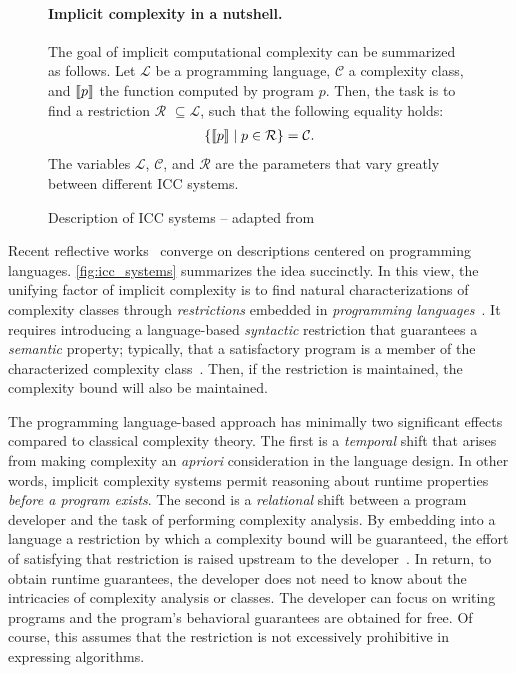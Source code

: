 \begin{figure}[t]
    \begin{mdframed}
        \paragraph*{Implicit complexity in a nutshell.}
        The goal of implicit computational complexity can be summarized as follows.
        Let \(\mathcal{L}\) be a programming language,
        \(\mathcal{C}\) a complexity class,
        and \(\llbracket p\rrbracket\) the function computed by program \(p\).
        Then, the task is to find a restriction \(\mathcal{R}\) \(\subseteq \mathcal{L}\), such that the following equality holds:
        \begin{align*}\{ \llbracket p\rrbracket \mid p \in \mathcal{R} \} = \mathcal{C}.\end{align*}
        The variables \(\mathcal{L}\),
        \(\mathcal{C}\), and
        \(\mathcal{R}\) are the parameters that vary greatly between different ICC systems.
    \end{mdframed}
    \caption[Implicit complexity in a nutshell]
    {Description of ICC systems -- adapted from~\textcite[p. 7]{pchoux2020}}
    \label{fig:icc_systems}
\end{figure}

Recent reflective works~\cite{pchoux2020,hoffmann2022} converge on descriptions centered on programming languages.
\autoref{fig:icc_systems} summarizes the idea succinctly.
In this view, the unifying factor of implicit complexity is to find natural characterizations of complexity classes through \emph{restrictions} embedded in \emph{programming languages}~\cite{hoffmann2022}.
It requires introducing a language-based \emph{syntactic} restriction that guarantees a \emph{semantic} property;
typically, that a satisfactory program is a member of the characterized complexity class~\cite{moyen2017}.
Then, if the restriction is maintained, the complexity bound will also be maintained.

The programming language-based approach has minimally two significant effects compared to classical complexity theory.
The first is a \emph{temporal} shift that arises from making complexity an \emph{apriori} consideration in the language design.
In other words, implicit complexity systems permit reasoning about runtime properties \emph{before a program exists}.
The second is a \emph{relational} shift between a program developer and the task of performing complexity analysis.
By embedding into a language a restriction by which a complexity bound will be guaranteed, the effort of satisfying that restriction is raised upstream to the developer~\cite{moyen2017}.
In return, to obtain runtime guarantees, the developer does not need to know about the intricacies of complexity analysis or classes.
The developer can focus on writing programs and the program's behavioral guarantees are obtained for free.
Of course, this assumes that the restriction is not excessively prohibitive in expressing algorithms.

